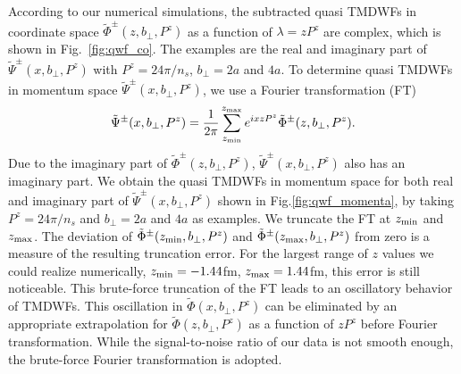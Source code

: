 \documentclass[prd,aps,twocolumn,preprintnumbers, showpacs, nofootinbib,superscriptaddress,notitlepage]{revtex4-1}
\begin{document}
According to our numerical simulations, the subtracted quasi TMDWFs in coordinate space $\tilde{\Phi}^{\pm}(z,b_{\perp},P^z)$ as a function of $\lambda=zP^z$ are complex, which is shown in Fig.~\ref{fig:qwf_co}. The examples are the real and imaginary part of $\tilde{\Psi}^{\pm}(x,b_{\perp},P^z)$ with $P^z=24\pi/n_s$, $b_{\perp}=2a$ and $4a$. 
To determine quasi TMDWFs in momentum space $\tilde{\Psi}^{\pm}(x,b_{\perp},P^z)$, we use a  Fourier transformation (FT)
\begin{align}
\tilde{\Psi}^{\pm}(x,b_{\perp},P^z)=\frac{1}{2\pi}\sum_{z_{\rm min}}^{z_{\rm max}}e^{ixzP^z}\tilde{\Phi}^{\pm}(z,b_{\perp},P^z).
\label{eq:FT}
\end{align}
Due to the imaginary part of $\tilde{\Phi}^{\pm}(z,b_{\perp},P^z)$,  $\tilde{\Psi}^{\pm}(x,b_{\perp},P^z)$ also has an imaginary part. We obtain the quasi TMDWFs in momentum space for both real and imaginary part of $\tilde{\Psi}^{\pm}(x,b_{\perp},P^z)$ shown in Fig.\ref{fig:qwf_momenta}, by taking $P^z=24\pi/n_s$ and $b_{\perp}=2a$ and $4a$ as examples. We truncate the FT at $z_{\rm min}$ and $z_{\rm max}$. The deviation of
  $\tilde{\Phi}^{\pm}(z_{\rm min},b_{\perp},P^z)$ and $\tilde{\Phi}^{\pm}(z_{\rm max},b_{\perp},P^z)$ from zero is a measure of the resulting truncation error. For the largest range of $z$ values we could realize numerically, $z_{\rm min}=-1.44$fm, $z_{\rm max}=1.44$fm, this error is still noticeable. This brute-force truncation of the FT leads to an oscillatory behavior of TMDWFs. This oscillation in $\tilde{\Phi}(x,b_{\perp},P^z)$ can be eliminated by an appropriate extrapolation for $\tilde{\Phi}(z,b_{\perp},P^z)$ as a function of $zP^z$ before Fourier transformation. While the signal-to-noise ratio of our data is not smooth enough, the brute-force Fourier transformation is adopted. 
\newpage
\end{document}
